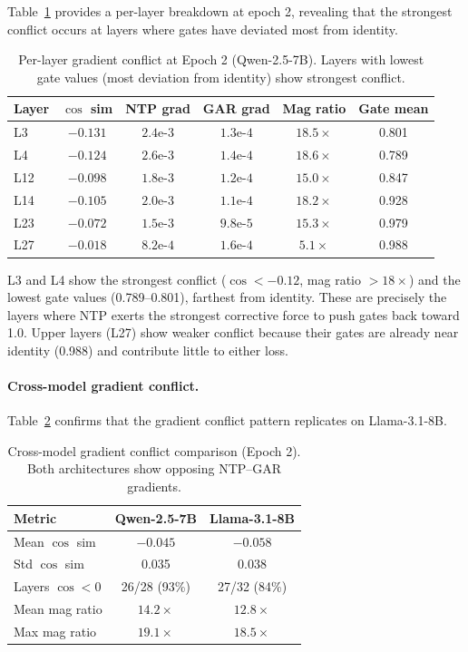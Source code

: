 \documentclass[11pt,a4paper]{article}
\newcommand{\gar}{\textsc{GAR}}
\begin{document}
Table~\ref{tab:gradient-layer} provides a per-layer breakdown at epoch 2, revealing that the strongest conflict occurs at layers where gates have deviated most from identity.

\begin{table}[H]
\centering
\caption{Per-layer gradient conflict at Epoch 2 (Qwen-2.5-7B). Layers with lowest gate values (most deviation from identity) show strongest conflict.}
\label{tab:gradient-layer}
\begin{tabular}{lccccc}
\toprule
\textbf{Layer} & \textbf{$\cos$ sim} & \textbf{NTP grad} & \textbf{GAR grad} & \textbf{Mag ratio} & \textbf{Gate mean} \\
\midrule
L3  & $-0.131$ & $2.4\text{e-}3$ & $1.3\text{e-}4$ & $18.5\times$ & 0.801 \\
L4  & $-0.124$ & $2.6\text{e-}3$ & $1.4\text{e-}4$ & $18.6\times$ & 0.789 \\
L12 & $-0.098$ & $1.8\text{e-}3$ & $1.2\text{e-}4$ & $15.0\times$ & 0.847 \\
L14 & $-0.105$ & $2.0\text{e-}3$ & $1.1\text{e-}4$ & $18.2\times$ & 0.928 \\
L23 & $-0.072$ & $1.5\text{e-}3$ & $9.8\text{e-}5$ & $15.3\times$ & 0.979 \\
L27 & $-0.018$ & $8.2\text{e-}4$ & $1.6\text{e-}4$ & $5.1\times$ & 0.988 \\
\bottomrule
\end{tabular}
\end{table}

L3 and L4 show the strongest conflict ($\cos < -0.12$, mag ratio $> 18\times$) and the lowest gate values (0.789--0.801), farthest from identity.
These are precisely the layers where NTP exerts the strongest corrective force to push gates back toward 1.0.
Upper layers (L27) show weaker conflict because their gates are already near identity (0.988) and contribute little to either loss.

\paragraph{Cross-model gradient conflict.}
Table~\ref{tab:gradient-crossmodel} confirms that the gradient conflict pattern replicates on Llama-3.1-8B.

\begin{table}[H]
\centering
\caption{Cross-model gradient conflict comparison (Epoch 2). Both architectures show opposing NTP--\gar{} gradients.}
\label{tab:gradient-crossmodel}
\begin{tabular}{lcc}
\toprule
\textbf{Metric} & \textbf{Qwen-2.5-7B} & \textbf{Llama-3.1-8B} \\
\midrule
Mean $\cos$ sim     & $-0.045$ & $-0.058$ \\
Std $\cos$ sim      & 0.035    & 0.038 \\
Layers $\cos < 0$   & 26/28 (93\%) & 27/32 (84\%) \\
Mean mag ratio      & $14.2\times$ & $12.8\times$ \\
Max mag ratio       & $19.1\times$ & $18.5\times$ \\
\bottomrule
\end{tabular}
\end{table}
\end{document}

